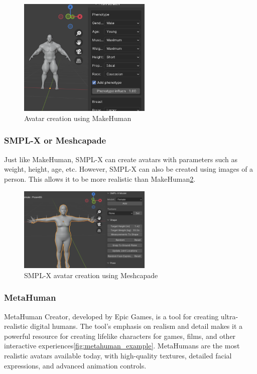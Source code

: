 \documentclass[../../main.tex]{subfiles}
\begin{document}
\begin{figure}
  \centering \includegraphics[width = 2.5in]{chapters/background_work/images/makehuman_example.png}
  \caption{Avatar creation using MakeHuman}
  \label{fig:makehuman_example}
\end{figure}

\subsubsection{SMPL-X or Meshcapade}

Just like MakeHuman, SMPL-X can create avatars with parameters such as weight, height, age, etc. However, SMPL-X can also be created using images of a person. This allows it to be more realistic than MakeHuman\ref{fig:smpl_creation_example}.

\begin{figure}
  \centering \includegraphics[width = 2.5in]{chapters/background_work/images/smpl_creation_example.png}
  \caption{SMPL-X avatar creation using Meshcapade}
  \label{fig:smpl_creation_example}
\end{figure}

\subsubsection{MetaHuman}

MetaHuman Creator, developed by Epic Games, is a tool for creating ultra-realistic digital humans. The tool's emphasis on realism and detail makes it a powerful resource for creating lifelike characters for games, films, and other interactive experiences\ref{fig:metahuman_example}. MetaHumans are the most realistic avatars available today, with high-quality textures, detailed facial expressions, and advanced animation controls.
\end{document}
